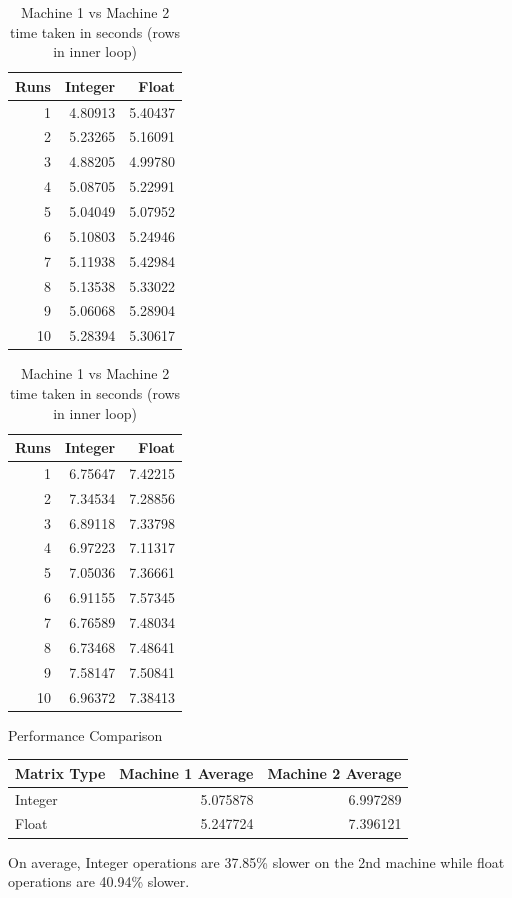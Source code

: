 \documentclass[
]{article}
\begin{document}
\begin{table}
\caption{\label{tab:unnamed-chunk-8}Machine 1 vs Machine 2 time taken in seconds (rows in inner loop)}

\centering
\begin{tabular}[t]{r|r|r}
\hline
Runs & Integer & Float\\
\hline
1 & 4.80913 & 5.40437\\
\hline
2 & 5.23265 & 5.16091\\
\hline
3 & 4.88205 & 4.99780\\
\hline
4 & 5.08705 & 5.22991\\
\hline
5 & 5.04049 & 5.07952\\
\hline
6 & 5.10803 & 5.24946\\
\hline
7 & 5.11938 & 5.42984\\
\hline
8 & 5.13538 & 5.33022\\
\hline
9 & 5.06068 & 5.28904\\
\hline
10 & 5.28394 & 5.30617\\
\hline
\end{tabular}
\centering
\begin{tabular}[t]{r|r|r}
\hline
Runs & Integer & Float\\
\hline
1 & 6.75647 & 7.42215\\
\hline
2 & 7.34534 & 7.28856\\
\hline
3 & 6.89118 & 7.33798\\
\hline
4 & 6.97223 & 7.11317\\
\hline
5 & 7.05036 & 7.36661\\
\hline
6 & 6.91155 & 7.57345\\
\hline
7 & 6.76589 & 7.48034\\
\hline
8 & 6.73468 & 7.48641\\
\hline
9 & 7.58147 & 7.50841\\
\hline
10 & 6.96372 & 7.38413\\
\hline
\end{tabular}
\end{table}

Performance Comparison

\begin{longtable}[]{@{}lrr@{}}
\toprule
Matrix Type & Machine 1 Average & Machine 2 Average\tabularnewline
\midrule
\endhead
Integer & 5.075878 & 6.997289\tabularnewline
Float & 5.247724 & 7.396121\tabularnewline
\bottomrule
\end{longtable}

On average, Integer operations are 37.85\% slower on the 2nd machine
while float operations are 40.94\% slower.
\end{document}

